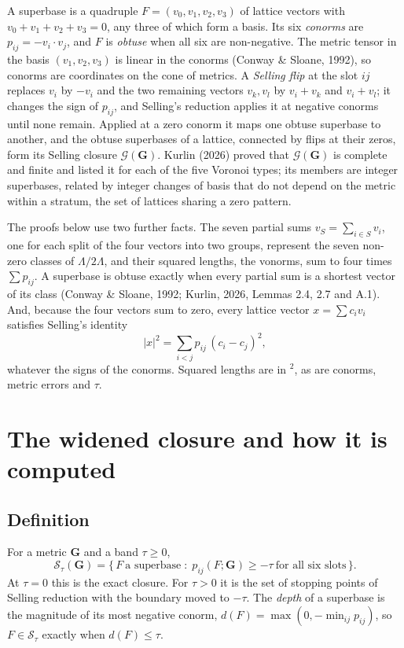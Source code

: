 \documentclass[preprint,pdf]{iucr}          %
\newcommand{\Ang}{\text{\AA}}
\newcommand{\Gmet}{\mathbf{G}}
\newcommand{\Sw}{\mathcal{S}_\tau}
\newcommand{\Cl}{\mathcal{G}}
\begin{document}
A superbase is a quadruple $F=(v_0,v_1,v_2,v_3)$ of lattice vectors with $v_0+v_1+v_2+v_3=0$, any three of which form a basis. Its six \emph{conorms} are $p_{ij}=-v_i\cdot v_j$, and $F$ is \emph{obtuse} when all six are non-negative. The metric tensor in the basis $(v_1,v_2,v_3)$ is linear in the conorms (Conway \& Sloane, 1992), so conorms are coordinates on the cone of metrics. A \emph{Selling flip} at the slot $ij$ replaces $v_i$ by $-v_i$ and the two remaining vectors $v_k,v_l$ by $v_i+v_k$ and $v_i+v_l$; it changes the sign of $p_{ij}$, and Selling's reduction applies it at negative conorms until none remain. Applied at a zero conorm it maps one obtuse superbase to another, and the obtuse superbases of a lattice, connected by flips at their zeros, form its Selling closure $\Cl(\Gmet)$. Kurlin (2026) proved that $\Cl(\Gmet)$ is complete and finite and listed it for each of the five Voronoi types; its members are integer superbases, related by integer changes of basis that do not depend on the metric within a stratum, the set of lattices sharing a zero pattern.

The proofs below use two further facts. The seven partial sums $v_S=\sum_{i\in S}v_i$, one for each split of the four vectors into two groups, represent the seven non-zero classes of $\Lambda/2\Lambda$, and their squared lengths, the vonorms, sum to four times $\sum p_{ij}$. A superbase is obtuse exactly when every partial sum is a shortest vector of its class (Conway \& Sloane, 1992; Kurlin, 2026, Lemmas 2.4, 2.7 and A.1). And, because the four vectors sum to zero, every lattice vector $x=\sum c_iv_i$ satisfies Selling's identity
\begin{equation}
|x|^2=\sum_{i<j}p_{ij}\,(c_i-c_j)^2 ,
\label{eq:selling}
\end{equation}
whatever the signs of the conorms. Squared lengths are in \Ang$^2$, as are conorms, metric errors and $\tau$.

\section{The widened closure and how it is computed}
\label{sec:methods}

\subsection{Definition}
For a metric $\Gmet$ and a band $\tau\ge0$,
\begin{equation}
\Sw(\Gmet)=\bigl\{\,F\ \text{a superbase}\;:\;p_{ij}(F;\Gmet)\ge-\tau\ \text{for all six slots}\,\bigr\}.
\label{eq:def}
\end{equation}
At $\tau=0$ this is the exact closure. For $\tau>0$ it is the set of stopping points of Selling reduction with the boundary moved to $-\tau$. The \emph{depth} of a superbase is the magnitude of its most negative conorm, $d(F)=\max(0,-\min_{ij}p_{ij})$, so $F\in\Sw$ exactly when $d(F)\le\tau$.
\end{document}

